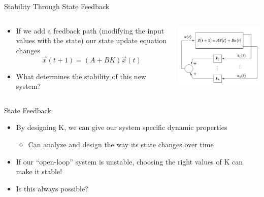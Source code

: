 \begin{frame}{Stability Through State Feedback}

\begin{columns}[T] %
\begin{column}{.48\textwidth}
%
    \begin{itemize}
        \item If we add a feedback path (modifying the input values with the state) our state update equation changes \[ \vec x(t + 1) = (A + BK) \vec x(t)\]
        \item What determines the stability of this new system?
    \end{itemize}

\end{column}%
\hfill%
\begin{column}{.48\textwidth}
    \includegraphics[width=\textwidth]{./images/block-diagram-of-system.png}

\end{column}%
\end{columns}

\end{frame}

\begin{frame}{State Feedback}
    \begin{itemize}
        \item 
By designing K, we can give our system specific dynamic properties
            \begin{itemize}
        \item 
Can analyze and design the way its state changes over time
            \end{itemize}
        \item 
If our “open-loop” system is unstable, choosing the right values of K can make it stable!
        \item 
Is this always possible?
    \end{itemize}
\end{frame}

